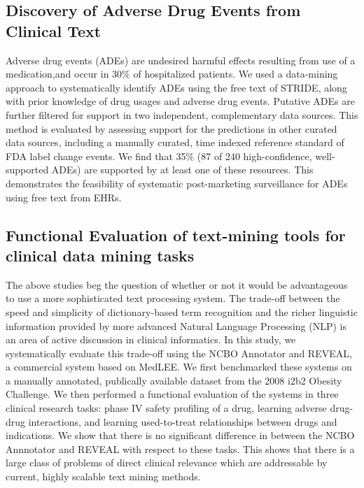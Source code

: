 \subsection{Discovery of Adverse Drug Events from
  Clinical Text}
Adverse drug events (ADEs) are undesired harmful effects resulting
from use of a medication,and occur in 30\% of hospitalized patients.
We used a data-mining approach to systematically identify ADEs using
the free text of STRIDE, along with prior knowledge of drug usages and
adverse drug events.  Putative ADEs are further filtered for support
in two independent, complementary data sources.  This method is
evaluated by assessing support for the predictions in other curated
data sources, including a manually curated, time indexed reference
standard of FDA label change events.  We find that 35\% (87 of 240
high-confidence, well-supported ADEs) are supported by at least one of
these resources.  This demonstrates the feasibility of systematic
post-marketing surveillance for ADEs using free text from EHRs.  

\subsection{Functional Evaluation of text-mining tools for clinical
  data mining tasks}
The above studies beg the question of whether or not it would be
advantageous to use a more sophisticated text processing system.  
The trade-off between the speed and simplicity of dictionary-based
term recognition and the richer linguistic information provided by
more advanced Natural Language Processing (NLP) is an area of active
discussion in clinical informatics.  In this study, we systematically
evaluate this trade-off using the NCBO Annotator and REVEAL, a
commercial system based on MedLEE.  We first benchmarked these systems
on a manually annotated, publically available dataset from the 2008
i2b2 Obesity Challenge.  We then performed a functional evaluation of
the systems in three clinical research tasks: phase IV safety
profiling of a drug, learning adverse drug-drug interactions, and
learning used-to-treat relationships between drugs and indications.
We show that there is no significant difference in between the NCBO
Annnotator and REVEAL with respect to these tasks.  This shows that
there is a large class of problems of direct clinical relevance which
are addressable by current, highly scalable text mining methods.


